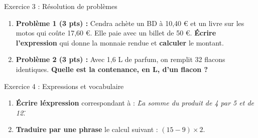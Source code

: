 \begin{exercisebox}{ Exercice 3 : Résolution de problèmes }
	\begin{enumerate}[leftmargin=*]
		\item \textbf{Problème 1 (3 pts) :}
    Cendra achète un BD à 10,40 € et un livre sur les motos qui coûte 17,60 €. Elle paie avec un billet de 50 €. \textbf{Écrire l'expression} qui donne la monnaie rendue et \textbf{calculer} le montant.
		
		\item \textbf{Problème 2 (3 pts) :}
    Avec 1,6 L de parfum, on remplit 32 flacons identiques. \textbf{Quelle est la contenance, en L, d'un flacon ?}
	\end{enumerate}
\end{exercisebox}

\begin{exercisebox}{ Exercice 4 : Expressions et vocabulaire }
	\begin{enumerate}[label=\textcolor{primary}{\textbf{\alph*)}},leftmargin=*]
        \item \textbf{Écrire l\'expression} correspondant à : \textit{\"La somme du produit de 4 par 5 et de 12\".} 
		
        \item \textbf{Traduire par une phrase} le calcul suivant : $(15 - 9) \times 2$. 
	\end{enumerate}
\end{exercisebox}

\vspace{0.2cm}
\begin{center}
\end{center}

